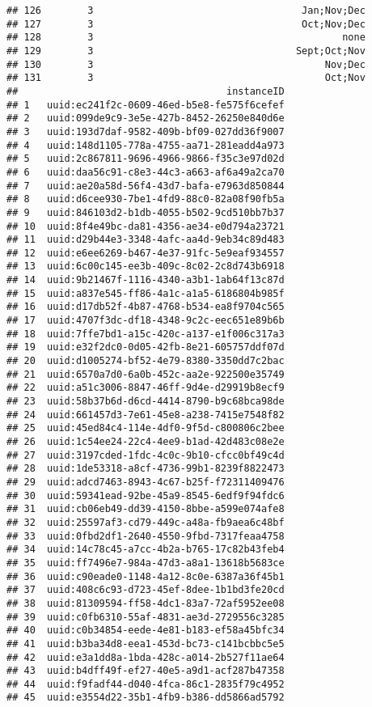 \documentclass[
]{article}
\begin{document}
\begin{verbatim}
## 126        3                                    Jan;Nov;Dec
## 127        3                                    Oct;Nov;Dec
## 128        3                                           none
## 129        3                                   Sept;Oct;Nov
## 130        3                                        Nov;Dec
## 131        3                                        Oct;Nov
##                                    instanceID
## 1   uuid:ec241f2c-0609-46ed-b5e8-fe575f6cefef
## 2   uuid:099de9c9-3e5e-427b-8452-26250e840d6e
## 3   uuid:193d7daf-9582-409b-bf09-027dd36f9007
## 4   uuid:148d1105-778a-4755-aa71-281eadd4a973
## 5   uuid:2c867811-9696-4966-9866-f35c3e97d02d
## 6   uuid:daa56c91-c8e3-44c3-a663-af6a49a2ca70
## 7   uuid:ae20a58d-56f4-43d7-bafa-e7963d850844
## 8   uuid:d6cee930-7be1-4fd9-88c0-82a08f90fb5a
## 9   uuid:846103d2-b1db-4055-b502-9cd510bb7b37
## 10  uuid:8f4e49bc-da81-4356-ae34-e0d794a23721
## 11  uuid:d29b44e3-3348-4afc-aa4d-9eb34c89d483
## 12  uuid:e6ee6269-b467-4e37-91fc-5e9eaf934557
## 13  uuid:6c00c145-ee3b-409c-8c02-2c8d743b6918
## 14  uuid:9b21467f-1116-4340-a3b1-1ab64f13c87d
## 15  uuid:a837e545-ff86-4a1c-a1a5-6186804b985f
## 16  uuid:d17db52f-4b87-4768-b534-ea8f9704c565
## 17  uuid:4707f3dc-df18-4348-9c2c-eec651e89b6b
## 18  uuid:7ffe7bd1-a15c-420c-a137-e1f006c317a3
## 19  uuid:e32f2dc0-0d05-42fb-8e21-605757ddf07d
## 20  uuid:d1005274-bf52-4e79-8380-3350dd7c2bac
## 21  uuid:6570a7d0-6a0b-452c-aa2e-922500e35749
## 22  uuid:a51c3006-8847-46ff-9d4e-d29919b8ecf9
## 23  uuid:58b37b6d-d6cd-4414-8790-b9c68bca98de
## 24  uuid:661457d3-7e61-45e8-a238-7415e7548f82
## 25  uuid:45ed84c4-114e-4df0-9f5d-c800806c2bee
## 26  uuid:1c54ee24-22c4-4ee9-b1ad-42d483c08e2e
## 27  uuid:3197cded-1fdc-4c0c-9b10-cfcc0bf49c4d
## 28  uuid:1de53318-a8cf-4736-99b1-8239f8822473
## 29  uuid:adcd7463-8943-4c67-b25f-f72311409476
## 30  uuid:59341ead-92be-45a9-8545-6edf9f94fdc6
## 31  uuid:cb06eb49-dd39-4150-8bbe-a599e074afe8
## 32  uuid:25597af3-cd79-449c-a48a-fb9aea6c48bf
## 33  uuid:0fbd2df1-2640-4550-9fbd-7317feaa4758
## 34  uuid:14c78c45-a7cc-4b2a-b765-17c82b43feb4
## 35  uuid:ff7496e7-984a-47d3-a8a1-13618b5683ce
## 36  uuid:c90eade0-1148-4a12-8c0e-6387a36f45b1
## 37  uuid:408c6c93-d723-45ef-8dee-1b1bd3fe20cd
## 38  uuid:81309594-ff58-4dc1-83a7-72af5952ee08
## 39  uuid:c0fb6310-55af-4831-ae3d-2729556c3285
## 40  uuid:c0b34854-eede-4e81-b183-ef58a45bfc34
## 41  uuid:b3ba34d8-eea1-453d-bc73-c141bcbbc5e5
## 42  uuid:e3a1dd8a-1bda-428c-a014-2b527f11ae64
## 43  uuid:b4dff49f-ef27-40e5-a9d1-acf287b47358
## 44  uuid:f9fadf44-d040-4fca-86c1-2835f79c4952
## 45  uuid:e3554d22-35b1-4fb9-b386-dd5866ad5792

\end{verbatim}
\end{document}
